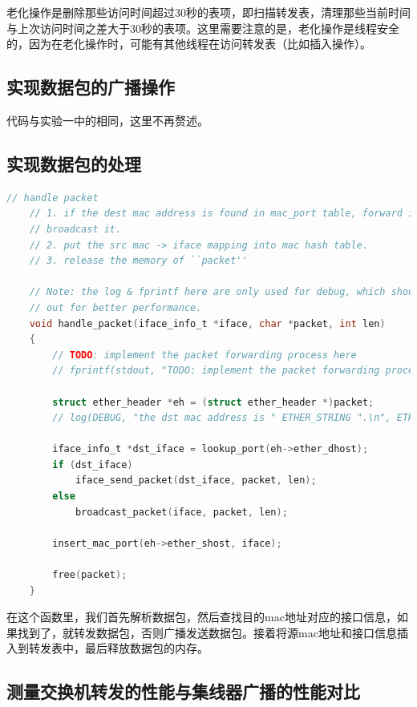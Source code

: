 \documentclass[UTF8]{report}
\begin{document}
老化操作是删除那些访问时间超过30秒的表项，即扫描转发表，清理那些当前时间与上次访问时间之差大于30秒的表项。这里需要注意的是，老化操作是线程安全的，因为在老化操作时，可能有其他线程在访问转发表（比如插入操作）。

\subsection{实现数据包的广播操作}

代码与实验一中的相同，这里不再赘述。

\subsection{实现数据包的处理}

\begin{lstlisting}[language=C]
    // handle packet
    // 1. if the dest mac address is found in mac_port table, forward it; otherwise, 
    // broadcast it.
    // 2. put the src mac -> iface mapping into mac hash table.
    // 3. release the memory of ``packet''
    
    // Note: the log & fprintf here are only used for debug, which should be commented 
    // out for better performance.
    void handle_packet(iface_info_t *iface, char *packet, int len)
    {
        // TODO: implement the packet forwarding process here
        // fprintf(stdout, "TODO: implement the packet forwarding process here.\n");
    
        struct ether_header *eh = (struct ether_header *)packet;
        // log(DEBUG, "the dst mac address is " ETHER_STRING ".\n", ETHER_FMT(eh->ether_dhost));
    
        iface_info_t *dst_iface = lookup_port(eh->ether_dhost);
        if (dst_iface) 
            iface_send_packet(dst_iface, packet, len);
        else 
            broadcast_packet(iface, packet, len);
    
        insert_mac_port(eh->ether_shost, iface);
    
        free(packet);
    }
\end{lstlisting}

在这个函数里，我们首先解析数据包，然后查找目的mac地址对应的接口信息，如果找到了，就转发数据包，否则广播发送数据包。接着将源mac地址和接口信息插入到转发表中，最后释放数据包的内存。

\subsection{测量交换机转发的性能与集线器广播的性能对比}
\end{document}
